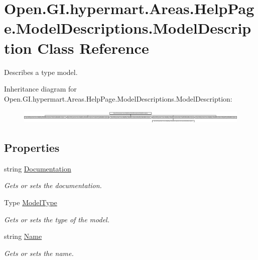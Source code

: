 \hypertarget{class_open_1_1_g_i_1_1hypermart_1_1_areas_1_1_help_page_1_1_model_descriptions_1_1_model_description}{}\section{Open.\+G\+I.\+hypermart.\+Areas.\+Help\+Page.\+Model\+Descriptions.\+Model\+Description Class Reference}
\label{class_open_1_1_g_i_1_1hypermart_1_1_areas_1_1_help_page_1_1_model_descriptions_1_1_model_description}


Describes a type model.  


Inheritance diagram for Open.\+G\+I.\+hypermart.\+Areas.\+Help\+Page.\+Model\+Descriptions.\+Model\+Description\+:\begin{figure}[H]
\begin{center}
\leavevmode
\includegraphics[height=0.652427cm]{class_open_1_1_g_i_1_1hypermart_1_1_areas_1_1_help_page_1_1_model_descriptions_1_1_model_description}
\end{center}
\end{figure}
\subsection*{Properties}
\begin{DoxyCompactItemize}
\item 
string \hyperlink{class_open_1_1_g_i_1_1hypermart_1_1_areas_1_1_help_page_1_1_model_descriptions_1_1_model_description_af08e1f5a6e3a28669b602926cb9a07b9}{Documentation}
\begin{DoxyCompactList}\small\item\em Gets or sets the documentation. \end{DoxyCompactList}\item 
Type \hyperlink{class_open_1_1_g_i_1_1hypermart_1_1_areas_1_1_help_page_1_1_model_descriptions_1_1_model_description_ab41d4f322450e3a2cde611673ca4abb1}{Model\+Type}
\begin{DoxyCompactList}\small\item\em Gets or sets the type of the model. \end{DoxyCompactList}\item 
string \hyperlink{class_open_1_1_g_i_1_1hypermart_1_1_areas_1_1_help_page_1_1_model_descriptions_1_1_model_description_aa5a42ec74b1d880ce15fd12b8ef0baf9}{Name}
\begin{DoxyCompactList}\small\item\em Gets or sets the name. \end{DoxyCompactList}\end{DoxyCompactItemize}


